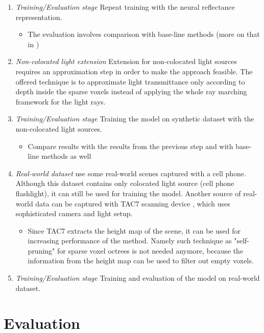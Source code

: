 \documentclass[english]{article}
\begin{document}
\begin{enumerate}
    \item \textit{Training/Evaluation stage}
    Repeat training with the neural reflectance representation.
    \begin{itemize}
        \item The evaluation involves comparison with base-line methods (more on that in )
    \end{itemize}

    \item \textit{Non-colocated light extension}
    Extension for non-colocated light sources requires an approximation step in order to make the approach feasible.
    The offered technique is to approximate light transmittance only according to depth inside the sparse voxels instead of applying the whole ray marching framework for the light rays.
    
    \item \textit{Training/Evaluation stage}
    Training the model on synthetic dataset with the non-colocated light sources.
    \begin{itemize}
        \item Compare results with the results from the previous step and with base-line methods as well
    \end{itemize}
    
    \item \textit{Real-world dataset}
    \cite{nrf2020} use some real-world scenes captured with a cell phone.
    Although this dataset contains only colocated light source (cell phone flashlight), it can still be used for training the model.
    Another source of real-world data can be captured with TAC7 scanning device \cite{tac7}, which uses sophisticated camera and light setup.
    \begin{itemize}
        \item Since TAC7 extracts the height map of the scene, it can be used for increasing performance of the method. Namely such technique as "self-pruning" for sparse voxel octrees is not needed anymore, because the information from the height map can be used to filter out empty voxels.
    \end{itemize}
    
    \item \textit{Training/Evaluation stage}
    Training and evaluation of the model on real-world dataset.
\end{enumerate}

\section{Evaluation}
\label{evaluation}
\end{document}
